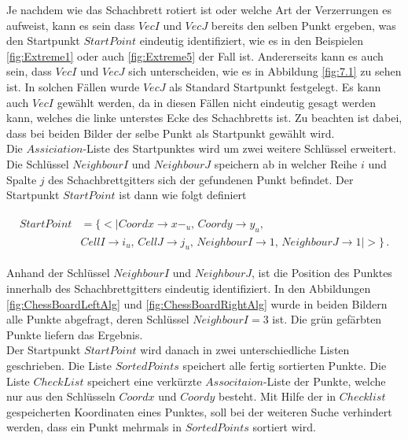 Je nachdem wie das Schachbrett rotiert ist oder welche Art der Verzerrungen es aufweist, kann es sein dass $VecI$ und $VecJ$ bereits den selben Punkt ergeben, was den Startpunkt $StartPoint$ eindeutig identifiziert, wie es in den Beispielen \ref{fig:Extreme1} oder auch \ref{fig:Extreme5} der Fall ist. Andererseits kann es auch sein, dass $VecI$ und $VecJ$ sich unterscheiden, wie es in Abbildung \ref{fig:7.1} zu sehen ist. In solchen Fällen wurde $VecJ$ als Standard Startpunkt festgelegt. Es kann auch $VecI$ gewählt werden, da in diesen Fällen nicht eindeutig gesagt werden kann, welches die linke unterstes Ecke des Schachbretts ist. Zu beachten ist dabei, dass bei beiden Bilder der selbe Punkt als Startpunkt gewählt wird.\\

Die $Assiciation$-Liste des Startpunktes wird um zwei weitere Schlüssel erweitert. Die Schlüssel $NeighbourI$ und $NeighbourJ$ speichern ab in welcher Reihe $i$ und Spalte $j$ des Schachbrettgitters sich der gefundenen Punkt befindet. Der Startpunkt $StartPoint$ ist dann wie folgt definiert


\begin{gather*}
	\begin{split}
			StartPoint &= \{ <|Coordx \rightarrow x-_u,\, Coordy \rightarrow y_u,\, \\
			&CellI \rightarrow i_u,\, CellJ \rightarrow j_u,\,
			NeighbourI \rightarrow 1, \,NeighbourJ \rightarrow 1 |>\}\, .
	\end{split} 
\end{gather*}
 
Anhand der Schlüssel $NeighbourI$ und $NeighbourJ$, ist die Position des Punktes innerhalb des Schachbrettgitters eindeutig identifiziert. In den Abbildungen \ref{fig:ChessBoardLeftAlg} und \ref{fig:ChessBoardRightAlg} wurde in beiden Bildern alle Punkte abgefragt, deren Schlüssel $NeighbourI = 3$ ist. Die grün gefärbten Punkte liefern das Ergebnis. \\

Der Startpunkt $StartPoint$ wird danach in zwei unterschiedliche Listen geschrieben. Die Liste $SortedPoints$ speichert alle fertig sortierten Punkte. Die Liste $CheckList$ speichert eine verkürzte $Associtaion$-Liste der Punkte, welche nur aus den Schlüsseln $Coordx$ und $Coordy$ besteht. 
\pagebreak
Mit Hilfe der in $Checklist$ gespeicherten Koordinaten eines Punktes, soll bei der weiteren Suche verhindert werden, dass ein Punkt mehrmals in $SortedPoints$ sortiert wird.\\



